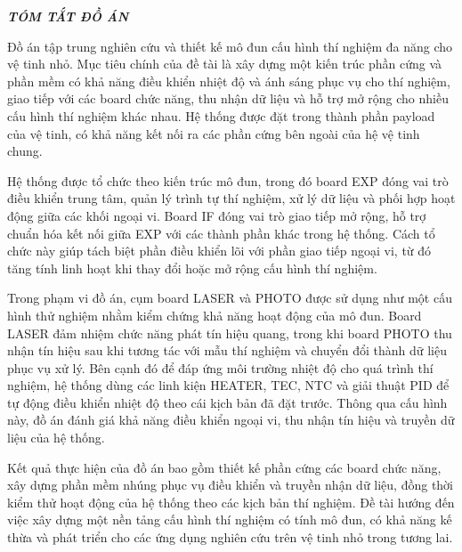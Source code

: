 {}
\thispagestyle{empty}

\begin{center}
    {\Large\textbf{\textit{\textcolor{TomTatTitleColor}{TÓM TẮT ĐỒ ÁN}}}}
\end{center}

\vspace{1.5em}

Đồ án tập trung nghiên cứu và thiết kế mô đun cấu hình thí nghiệm đa năng cho vệ tinh nhỏ. Mục tiêu chính của đề tài là xây dựng một kiến trúc phần cứng và phần mềm có khả năng điều khiển nhiệt độ và ánh sáng phục vụ cho thí nghiệm, giao tiếp với các board chức năng, thu nhận dữ liệu và hỗ trợ mở rộng cho nhiều cấu hình thí nghiệm khác nhau. Hệ thống được đặt trong thành phần payload của vệ tinh, có khả năng kết nối ra các phần cứng bên ngoài của hệ vệ tinh chung.

Hệ thống được tổ chức theo kiến trúc mô đun, trong đó board EXP đóng vai trò điều khiển trung tâm, quản lý trình tự thí nghiệm, xử lý dữ liệu và phối hợp hoạt động giữa các khối ngoại vi. Board IF đóng vai trò giao tiếp mở rộng, hỗ trợ chuẩn hóa kết nối giữa EXP với các thành phần khác trong hệ thống. Cách tổ chức này giúp tách biệt phần điều khiển lõi với phần giao tiếp ngoại vi, từ đó tăng tính linh hoạt khi thay đổi hoặc mở rộng cấu hình thí nghiệm.

Trong phạm vi đồ án, cụm board LASER và PHOTO được sử dụng như một cấu hình thử nghiệm nhằm kiểm chứng khả năng hoạt động của mô đun. Board LASER đảm nhiệm chức năng phát tín hiệu quang, trong khi board PHOTO thu nhận tín hiệu sau khi tương tác với mẫu thí nghiệm và chuyển đổi thành dữ liệu phục vụ xử lý. Bên cạnh đó để đáp ứng môi trường nhiệt độ cho quá trình thí nghiệm, hệ thống dùng các linh kiện HEATER, TEC, NTC và giải thuật PID để tự động điều khiển nhiệt độ theo cái kịch bản đã đặt trước. Thông qua cấu hình này, đồ án đánh giá khả năng điều khiển ngoại vi, thu nhận tín hiệu và truyền dữ liệu của hệ thống.

Kết quả thực hiện của đồ án bao gồm thiết kế phần cứng các board chức năng, xây dựng phần mềm nhúng phục vụ điều khiển và truyền nhận dữ liệu, đồng thời kiểm thử hoạt động của hệ thống theo các kịch bản thí nghiệm. Đề tài hướng đến việc xây dựng một nền tảng cấu hình thí nghiệm có tính mô đun, có khả năng kế thừa và phát triển cho các ứng dụng nghiên cứu trên vệ tinh nhỏ trong tương lai.

\vfill
